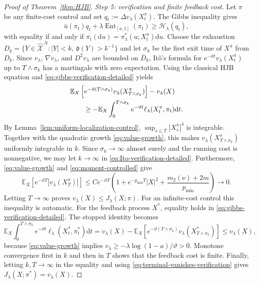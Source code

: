\documentclass[10pt,a4paper]{amsart}
\def\E{\mathbb{E}}
\newcommand{\Ent}{\operatorname{Ent}}
\def\Xc{{\mathcal X}}
\newcommand{\dd}{\mathrm{d}}
\def\hX{\widehat{\Xc}^{\,N}}
\newcommand{\pmin}{p_{\min}}
\begin{document}
\begin{proof}[Proof of Theorem~\ref{thm:HJB}]
\medskip
\noindent\textit{Step 5: verification and finite feedback cost.}
Let $\pi$ be any finite-cost control and set
$q_t:=\Delta v_\lambda(X_t^\pi)$.  The Gibbs inequality gives
\begin{equation}\label{eq:gibbs-verification-detailed}
 \bar u(\pi_t)q_t+\lambda\Ent_{[a,1]}(\pi_t)
 \ge\mathscr H_\lambda(q_t),
\end{equation}
with equality if and only if
$\pi_t(\dd u)=\pi_\lambda^*(u;X_t^\pi)\dd u$.
Choose the exhaustion
$D_k=\{Y\in\hX:|Y|<k,\ \mathfrak d(Y)>k^{-1}\}$ and let
$\sigma_k$ be the first exit time of $X^\pi$ from $D_k$.  Since
$v_\lambda$, $\nabla v_\lambda$, and $D^2v_\lambda$ are bounded on
$\overline D_k$, It\^o's formula for
$e^{-\vartheta t}v_\lambda(X_t^\pi)$ up to $T\wedge\sigma_k$ has a martingale with zero expectation.
Using the classical HJB equation and \eqref{eq:gibbs-verification-detailed} yields
\begin{align}
 &\E_X\left[e^{-\vartheta(T\wedge\sigma_k)}
 v_\lambda(X_{T\wedge\sigma_k}^\pi)\right]-v_\lambda(X)\notag\\
 &\qquad\ge-\E_X\int_0^{T\wedge\sigma_k}e^{-\vartheta t}
 \ell_\lambda(X_t^\pi,\pi_t)\dd t.
 \label{eq:Ito-verification-detailed}
\end{align}
By Lemma~\ref{lem:uniform-localization-control},
$\sup_{s\le T}|X_s^\pi|^4$ is integrable.  Together with the quadratic growth
\eqref{eq:value-growth}, this makes
$v_\lambda(X_{T\wedge\sigma_k}^\pi)$ uniformly integrable in $k$.  Since
$\sigma_k\to\infty$ almost surely and the running cost is nonnegative, we may let $k\to\infty$ in
\eqref{eq:Ito-verification-detailed}.  Furthermore, \eqref{eq:value-growth} and
\eqref{eq:moment-controlled} give
\begin{equation}\label{eq:terminal-vanishes-verification}
 \E_X\left[e^{-\vartheta T}|v_\lambda(X_T^\pi)|\right]
 \le C e^{-\vartheta T}
 \left(1+e^{-\pmin T}|X|^2+\frac{m_2(\nu)+2m}{\pmin}\right)
 \longrightarrow0.
\end{equation}
Letting $T\to\infty$ proves
$v_\lambda(X)\le J_\lambda(X;\pi)$.  For an infinite-cost control this inequality is automatic.
For the feedback process $X^*$, equality holds in
\eqref{eq:gibbs-verification-detailed}.  The stopped identity becomes
\[
 \E_X\int_0^{T\wedge\sigma_k}e^{-\vartheta t}
 \ell_\lambda(X_t^*,\pi_t^*)\dd t
 =v_\lambda(X)-
 \E_X\left[e^{-\vartheta(T\wedge\sigma_k)}
 v_\lambda(X_{T\wedge\sigma_k}^*)\right]
 \le v_\lambda(X),
\]
because \eqref{eq:value-growth} implies
$v_\lambda\ge-\lambda\log(1-a)/\vartheta>0$.  Monotone convergence first in $k$ and then in $T$
shows that the feedback cost is finite.  Finally, letting $k,T\to\infty$ in the equality and using
\eqref{eq:terminal-vanishes-verification} gives
$J_\lambda(X;\pi^*)=v_\lambda(X)$.
\end{proof}
\end{document}
